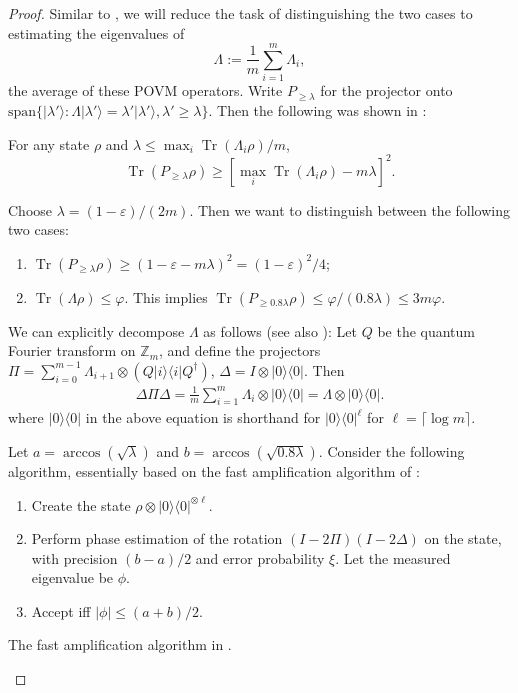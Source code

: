 \documentclass[a4paper,UKenglish,cleveref, autoref]{lipics-v2019}
\theoremstyle{remark}
\numberwithin{equation}{section}
\numberwithin{oracle}{section}
\numberwithin{remark}{section}
\newcommand{\ket}[1]{|#1\rangle}
\newcommand{\bra}[1]{\langle#1|}
\newcommand{\proj}[1]{\ket{#1}\bra{#1}}
\newcommand{\Z}{\ensuremath{\mathbb{Z}}}
\DeclareMathOperator{\tr}{Tr}
\begin{document}
\begin{proof}
Similar to \cite{harrow2017sequential}, we will reduce the task of distinguishing the two cases to estimating the eigenvalues of
\begin{equation}
\Lambda:=\frac{1}{m}\sum_{i=1}^{m}\Lambda_{i},
\end{equation}
the average of these POVM operators.
Write $P_{\geq\lambda}$ for the projector onto $\text{span}\{\ket{\lambda'}: \Lambda \ket{\lambda'} = \lambda' \ket{\lambda'},\lambda' \geq\lambda\}$. Then the following was shown in \cite{harrow2017sequential}:
\begin{lemma}
For any state $\rho$ and $\lambda \le \max_i \tr (\Lambda_i \rho)/m$,
\begin{equation}
\tr(P_{\ge \lambda}\rho) \ge [\max_i \tr (\Lambda_i \rho)-m\lambda]^2.
\end{equation}
\end{lemma}
Choose $\lambda = (1-\varepsilon)/(2m)$. Then we want to distinguish between the following two cases:
\begin{enumerate}
\item $\tr(P_{\ge \lambda } \rho) \geq (1-\varepsilon - m\lambda)^2 = (1-\varepsilon)^2/4$; \label{case:OR-case-1}
\item $\tr(\Lambda \rho) \leq\varphi$. This implies $\tr(P_{\ge 0.8\lambda}\rho) \le \varphi/(0.8\lambda) \le 3m\varphi$. \label{case:OR-case-2}
\end{enumerate}
We can explicitly decompose $\Lambda$ as follows (see also \cite[Section 2]{harrow2017sequential}): Let $Q$ be the quantum Fourier transform on $\Z_{m}$, and define the projectors $\Pi = \sum_{i = 0}^{m-1} \Lambda_{i+1} \otimes (Q\proj{i}Q^\dagger)$, $\Delta = I \otimes \proj{0}$. Then
\begin{align}
\Delta \Pi \Delta = \frac{1}{m} \sum_{i=1}^{m} \Lambda_i \otimes \proj{0} = \Lambda \otimes \proj{0}.
\end{align}
where $\proj{0}$ in the above equation is shorthand for $\proj{0}^{\ell}$ for $\ell = \lceil \log m \rceil$.

Let $a = \arccos(\sqrt{\lambda})$ and $b = \arccos (\sqrt{0.8\lambda})$. Consider the following algorithm, essentially based on the fast amplification algorithm of \cite{nagaj2009fast}:

\begin{algorithm}[H]
\begin{enumerate}
\item    Create the state $\rho \otimes \proj{0}^{\otimes \ell}$.
\item    Perform phase estimation of the rotation $(I - 2\Pi)(I - 2\Delta)$ on the state, with precision $(b-a)/2$ and error probability $\xi$. Let the measured eigenvalue be $\phi$.
\item   Accept iff $|\phi| \le (a+b)/2$.
\end{enumerate}
\caption{The fast amplification algorithm in \cite{nagaj2009fast}.}
\label{algo:fast-amplification}
\end{algorithm}


\end{proof}
\end{document}
